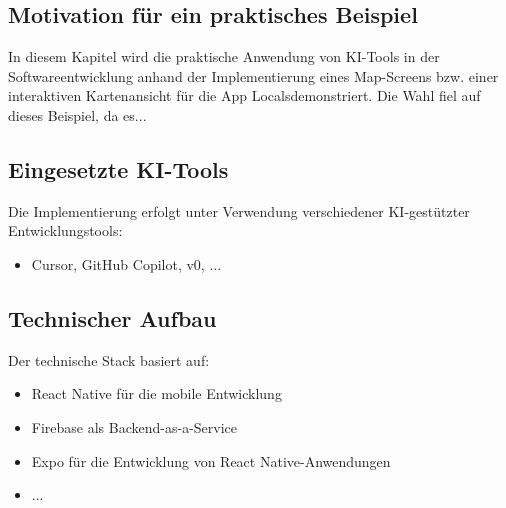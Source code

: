 \subsection{Motivation für ein praktisches Beispiel}
In diesem Kapitel wird die praktische Anwendung von KI-Tools in der Softwareentwicklung anhand der Implementierung eines Map-Screens bzw. einer interaktiven Kartenansicht für die App \glqq Locals\grqq demonstriert. Die Wahl fiel auf dieses Beispiel, da es...

\subsection{Eingesetzte KI-Tools}
Die Implementierung erfolgt unter Verwendung verschiedener KI-gestützter Entwicklungstools:
\begin{itemize}
    \item Cursor, GitHub Copilot, v0, ...

\end{itemize}

\subsection{Technischer Aufbau}
Der technische Stack basiert auf:
\begin{itemize}
    \item React Native für die mobile Entwicklung
    \item Firebase als Backend-as-a-Service
    \item Expo für die Entwicklung von React Native-Anwendungen
    \item ...
\end{itemize} 
